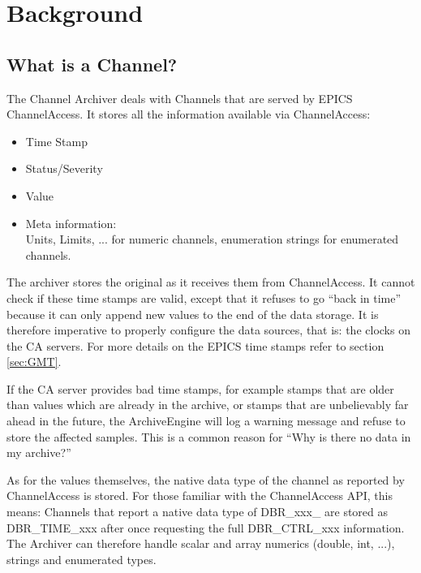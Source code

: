 \chapter{Background}

\section{What is a Channel?} %
The Channel Archiver deals with Channels that are served by EPICS
ChannelAccess. It stores all the information available via ChannelAccess:
\begin{itemize}
\item Time Stamp
\item Status/Severity
\item Value
\item Meta information:\\
      Units, Limits, ... for numeric channels,
      enumeration strings for enumerated channels.
\end{itemize}

\noindent The archiver stores the original  as it receives
them from ChannelAccess. It cannot check if these time stamps are valid, except
that it refuses to go ``back in time'' because it can only append new
values to the end of the data storage. It is therefore imperative to
properly configure the data sources, that is: the clocks on the CA
servers. For more details on the EPICS time stamps refer to section
\ref{sec:GMT}.

\label{back:in:time}
\NOTE If the CA server provides bad time stamps, for example stamps
that are older than values which are already in the archive, or stamps
that are unbelievably far ahead in the future, the ArchiveEngine will log
a warning message and refuse to store the affected samples.
This is a common reason for ``Why is there no data in my archive?''

As for the values themselves, the native data type of the channel as
reported by ChannelAccess is stored. For those familiar with the
ChannelAccess API, this means:
Channels that report a native data type of DBR\_xxx\_ are stored as
DBR\_TIME\_xxx after once requesting the full DBR\_CTRL\_xxx information.
 The Archiver can therefore handle scalar and array numerics
(double, int, ...), strings and enumerated types. 


